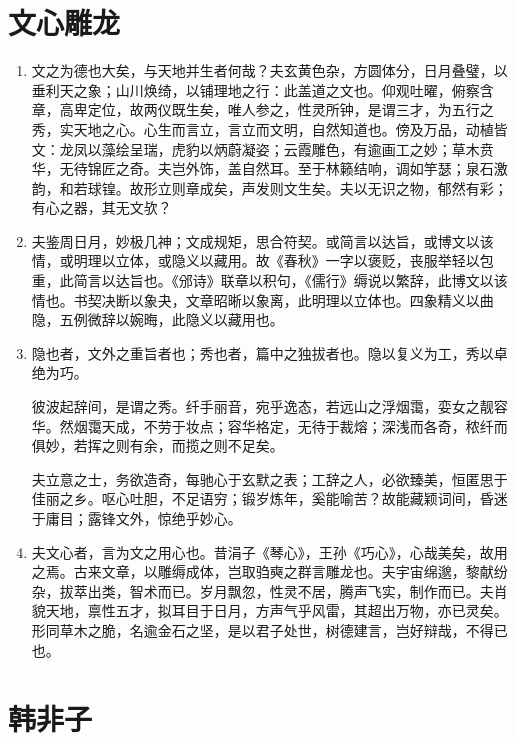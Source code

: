 \documentclass[UTF8]{ctexart}
\begin{document}
	\newpage
		
	\section{文心雕龙}
	
		
		\begin{enumerate}
			\item  文之为德也大矣，与天地并生者何哉？夫玄黄色杂，方圆体分，日月叠璧，以垂利天之象；山川焕绮，以铺理地之行：此盖道之文也。仰观吐曜，俯察含章，高卑定位，故两仪既生矣，唯人参之，性灵所钟，是谓三才，为五行之秀，实天地之心。心生而言立，言立而文明，自然知道也。傍及万品，动植皆文：龙凤以藻绘呈瑞，虎豹以炳蔚凝姿；云霞雕色，有逾画工之妙；草木贲华，无待锦匠之奇。夫岂外饰，盖自然耳。至于林籁结响，调如竽瑟；泉石激韵，和若球锽。故形立则章成矣，声发则文生矣。夫以无识之物，郁然有彩；有心之器，其无文欤？
			
			\item 夫鉴周日月，妙极几神；文成规矩，思合符契。或简言以达旨，或博文以该情，或明理以立体，或隐义以藏用。故《春秋》一字以褒贬，丧服举轻以包重，此简言以达旨也。《邠诗》联章以积句，《儒行》缛说以繁辞，此博文以该情也。书契决断以象夬，文章昭晰以象离，此明理以立体也。四象精义以曲隐，五例微辞以婉晦，此隐义以藏用也。
			
			\item 隐也者，文外之重旨者也；秀也者，篇中之独拔者也。隐以复义为工，秀以卓绝为巧。
			
			彼波起辞间，是谓之秀。纤手丽音，宛乎逸态，若远山之浮烟霭，娈女之靓容华。然烟霭天成，不劳于妆点；容华格定，无待于裁熔；深浅而各奇，秾纤而俱妙，若挥之则有余，而揽之则不足矣。
			
			夫立意之士，务欲造奇，每驰心于玄默之表；工辞之人，必欲臻美，恒匿思于佳丽之乡。呕心吐胆，不足语穷；锻岁炼年，奚能喻苦？故能藏颖词间，昏迷于庸目；露锋文外，惊绝乎妙心。
			
			\item 夫文心者，言为文之用心也。昔涓子《琴心》，王孙《巧心》，心哉美矣，故用之焉。古来文章，以雕缛成体，岂取驺奭之群言雕龙也。夫宇宙绵邈，黎献纷杂，拔萃出类，智术而已。岁月飘忽，性灵不居，腾声飞实，制作而已。夫肖貌天地，禀性五才，拟耳目于日月，方声气乎风雷，其超出万物，亦已灵矣。形同草木之脆，名逾金石之坚，是以君子处世，树德建言，岂好辩哉，不得已也。
		\end{enumerate}
		
	\newpage
	
	\section{韩非子}
	
\end{document}

